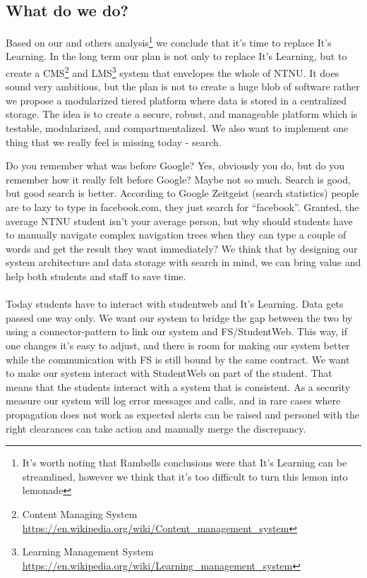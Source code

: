 \subsection{What do we do?}
Based on our and others analysis\footnote{It's worth noting that Rambølls conclusions were that It's Learning can be streamlined, 
however we think that it's too difficult to turn this lemon into lemonade} 
\cite{lmsstrat} we conclude that it's time to replace It's Learning. In the long term our plan is not only to replace It's 
Learning, but to create
a CMS\footnote{Content Managing System \url{https://en.wikipedia.org/wiki/Content_management_system}} and LMS\footnote{Learning 
Management System \url{https://en.wikipedia.org/wiki/Learning_management_system}} system that envelopes the whole of NTNU. It 
does sound very ambitious, but the plan is not to create a huge blob of software rather we propose a modularized tiered 
platform where data is stored in a centralized storage. The idea is to create a secure, robust, and manageable platform which is 
testable, modularized, and compartmentalized.
We also want to implement one thing that we really feel is missing today - search. 

Do you remember what was before Google? Yes, obviously you do, but do you remember how it really felt before Google? Maybe not so much. Search is good, but good search is better. 
According to Google Zeitgeist (search statistics) \cite{google:zeitgeist} people are to lazy to type in facebook.com, they just search for ``facebook''. Granted, the average NTNU 
student isn't your average person, but why should students have to manually navigate complex navigation trees when they can type a couple of words and get the result they want 
immediately? We think that by designing our system architecture and data storage with search in mind, we can bring value and help both students and staff to save time. 
\\\\
Today students have to interact with studentweb and It's Learning. Data gets passed one way only. We want our system to bridge the gap between the two by using a 
connector-pattern %
to link our system and FS/StudentWeb. This way, if one changes it's easy to adjust, and there is room for making our system better while the communication with FS is still bound by 
the same contract. We want to make our system interact with StudentWeb on part of the student. That means that the students interact with a system that is consistent. As a security 
measure our system will log error messages and calls, and in rare cases where propagation does not work as expected alerts can be raised and personel with the right clearances can 
take action and manually merge the discrepancy. %


